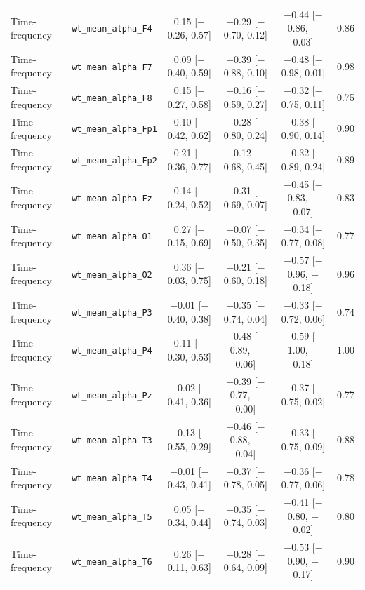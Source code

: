 {\begin{longtable}{llcccc}
Time-frequency & \texttt{wt\_mean\_alpha\_F4} & 0.15 [$-$0.26, 0.57] & $-$0.29 [$-$0.70, 0.12] & $-$0.44 [$-$0.86, $-$0.03] & 0.86 \\
Time-frequency & \texttt{wt\_mean\_alpha\_F7} & 0.09 [$-$0.40, 0.59] & $-$0.39 [$-$0.88, 0.10] & $-$0.48 [$-$0.98, 0.01] & 0.98 \\
Time-frequency & \texttt{wt\_mean\_alpha\_F8} & 0.15 [$-$0.27, 0.58] & $-$0.16 [$-$0.59, 0.27] & $-$0.32 [$-$0.75, 0.11] & 0.75 \\
Time-frequency & \texttt{wt\_mean\_alpha\_Fp1} & 0.10 [$-$0.42, 0.62] & $-$0.28 [$-$0.80, 0.24] & $-$0.38 [$-$0.90, 0.14] & 0.90 \\
Time-frequency & \texttt{wt\_mean\_alpha\_Fp2} & 0.21 [$-$0.36, 0.77] & $-$0.12 [$-$0.68, 0.45] & $-$0.32 [$-$0.89, 0.24] & 0.89 \\
Time-frequency & \texttt{wt\_mean\_alpha\_Fz} & 0.14 [$-$0.24, 0.52] & $-$0.31 [$-$0.69, 0.07] & $-$0.45 [$-$0.83, $-$0.07] & 0.83 \\
Time-frequency & \texttt{wt\_mean\_alpha\_O1} & 0.27 [$-$0.15, 0.69] & $-$0.07 [$-$0.50, 0.35] & $-$0.34 [$-$0.77, 0.08] & 0.77 \\
Time-frequency & \texttt{wt\_mean\_alpha\_O2} & 0.36 [$-$0.03, 0.75] & $-$0.21 [$-$0.60, 0.18] & $-$0.57 [$-$0.96, $-$0.18] & 0.96 \\
Time-frequency & \texttt{wt\_mean\_alpha\_P3} & $-$0.01 [$-$0.40, 0.38] & $-$0.35 [$-$0.74, 0.04] & $-$0.33 [$-$0.72, 0.06] & 0.74 \\
Time-frequency & \texttt{wt\_mean\_alpha\_P4} & 0.11 [$-$0.30, 0.53] & $-$0.48 [$-$0.89, $-$0.06] & $-$0.59 [$-$1.00, $-$0.18] & 1.00 \\
Time-frequency & \texttt{wt\_mean\_alpha\_Pz} & $-$0.02 [$-$0.41, 0.36] & $-$0.39 [$-$0.77, $-$0.00] & $-$0.37 [$-$0.75, 0.02] & 0.77 \\
Time-frequency & \texttt{wt\_mean\_alpha\_T3} & $-$0.13 [$-$0.55, 0.29] & $-$0.46 [$-$0.88, $-$0.04] & $-$0.33 [$-$0.75, 0.09] & 0.88 \\
Time-frequency & \texttt{wt\_mean\_alpha\_T4} & $-$0.01 [$-$0.43, 0.41] & $-$0.37 [$-$0.78, 0.05] & $-$0.36 [$-$0.77, 0.06] & 0.78 \\
Time-frequency & \texttt{wt\_mean\_alpha\_T5} & 0.05 [$-$0.34, 0.44] & $-$0.35 [$-$0.74, 0.03] & $-$0.41 [$-$0.80, $-$0.02] & 0.80 \\
Time-frequency & \texttt{wt\_mean\_alpha\_T6} & 0.26 [$-$0.11, 0.63] & $-$0.28 [$-$0.64, 0.09] & $-$0.53 [$-$0.90, $-$0.17] & 0.90 \\

\end{longtable}}
